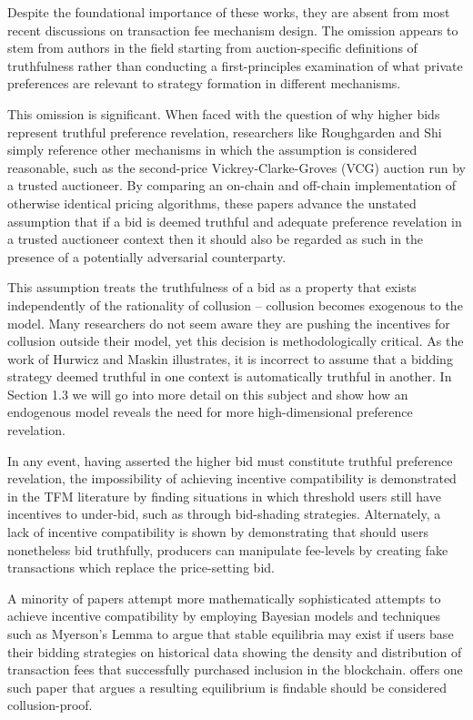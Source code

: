 \documentclass[oneside]{article}   	%
\begin{document}
Despite the foundational importance of these works, they are absent from most recent discussions on transaction fee mechanism design. The omission appears to stem from authors in the field starting from auction-specific definitions of truthfulness rather than conducting a first-principles examination of what private preferences are relevant to strategy formation in different mechanisms.

This omission is significant. When faced with the question of why higher bids represent truthful preference revelation, researchers like Roughgarden and Shi simply reference other mechanisms in which the assumption is considered reasonable, such as the second-price Vickrey-Clarke-Groves (VCG) auction run by a trusted auctioneer. By comparing an on-chain and off-chain implementation of otherwise identical pricing algorithms, these papers advance the unstated assumption that if a bid is deemed truthful and adequate preference revelation in a trusted auctioneer context then it should also be regarded as such in the presence of a potentially adversarial counterparty.

This assumption treats the truthfulness of a bid as a property that exists independently of the rationality of collusion -- collusion becomes exogenous to the model. Many researchers do not seem aware they are pushing the incentives for collusion outside their model, yet this decision is methodologically critical. As the work of Hurwicz and Maskin illustrates, it is incorrect to assume that a bidding strategy deemed truthful in one context is automatically truthful in another. In Section 1.3 we will go into more detail on this subject and show how an endogenous model reveals the need for more high-dimensional preference revelation.

In any event, having asserted the higher bid must constitute truthful preference revelation, the impossibility of achieving incentive compatibility is demonstrated in the TFM literature by finding situations in which threshold users still have incentives to under-bid, such as through bid-shading strategies. Alternately, a lack of incentive compatibility is shown by demonstrating that should users nonetheless bid truthfully, producers can manipulate fee-levels by creating fake transactions which replace the price-setting bid.

A minority of papers attempt more mathematically sophisticated attempts to achieve incentive compatibility by employing Bayesian models and techniques such as Myerson's Lemma to argue that stable equilibria may exist if users base their bidding strategies on historical data showing the density and distribution of transaction fees that successfully purchased inclusion in the blockchain. \cite{chen2022bayesian} offers one such paper that argues a resulting equilibrium is findable should be considered collusion-proof.
\end{document}
